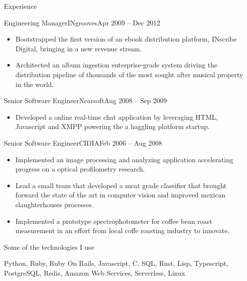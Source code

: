 \documentclass[calibri]{mcdowellcv}
\begin{document}
\begin{cvsection}{Experience}
\begin{cvsubsection}{Engineering Manager}{INgrooves}{Apr 2009 -- Dec 2012}
\begin{itemize}
    \item Bootstrapped the first version of an ebook distribution platform, INscribe Digital, bringing in a new revenue stream.
    \item Architected an album ingestion enterprise-grade system driving the distribution pipeline of thousands of the most sought after musical property in the world.
		\end{itemize}
	\end{cvsubsection}
	\begin{cvsubsection}{Senior Software Engineer}{Nearsoft}{Aug 2008 -- Sep 2009}
		\begin{itemize}%
    \item Developed a online real-time chat application by leveraging HTML, Javascript and XMPP powering the a haggling platform startup.
		\end{itemize}
	\end{cvsubsection}
	\begin{cvsubsection}{Senior Software Engineer}{CIDIA}{Feb 2006 -- Aug 2008}
		\begin{itemize}%
    \item Implemented an image processing and analyzing application accelerating progress on a optical profilometry research.
    \item Lead a small team that developed a meat grade classifier that brought forward the state of the art in computer vision and improved mexican slaughterhouses processes.
    \item Implemented a prototype spectrophotometer for coffee bean roast measurement in an effort from local coffe roasting industry to innovate.
		\end{itemize}
	\end{cvsubsection}
\end{cvsection}
\begin{cvsection}{Some of the technologies I use}
  \begin{cvsubsection}{}{}{}
    Python, Ruby, Ruby On Rails, Javascript, C, SQL, Rust, Lisp, Typescript, PostgreSQL, Redis, Amazon Web Services, Serverless, Linux
  \end{cvsubsection}
\end{cvsection}
\end{document}
